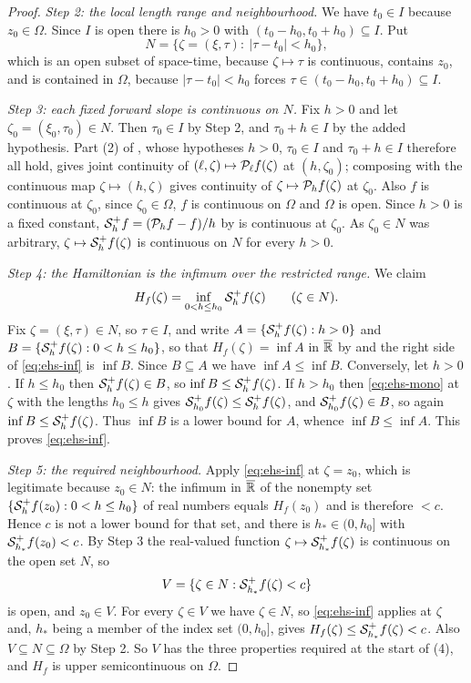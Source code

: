 \begin{proof}
\emph{Step 2: the local length range and neighbourhood.} We have $t_0\in I$
because $z_0\in\Omega$. Since $I$ is open there is $h_0>0$ with
$(t_0-h_0,t_0+h_0)\subseteq I$. Put
\[
  N=\{\zeta=(\xi,\tau):\ |\tau-t_0|<h_0\},
\]
which is an open subset of space-time, because $\zeta\mapsto\tau$ is continuous,
contains $z_0$, and is contained in $\Omega$, because $|\tau-t_0|<h_0$ forces
$\tau\in(t_0-h_0,t_0+h_0)\subseteq I$.

\emph{Step 3: each fixed forward slope is continuous on $N$.} Fix $h>0$ and let
$\zeta_0=(\xi_0,\tau_0)\in N$. Then $\tau_0\in I$ by Step 2, and
$\tau_0+h\in I$ by the added hypothesis. Part (2) of ,
whose hypotheses $h>0$, $\tau_0\in I$ and $\tau_0+h\in I$ therefore all hold,
gives joint continuity of $(\ell,\zeta)\mapsto\mathcal{P}_\ell f(\zeta)$ at
$(h,\zeta_0)$; composing with the continuous map
$\zeta\mapsto(h,\zeta)$ gives continuity of $\zeta\mapsto\mathcal{P}_hf(\zeta)$ at
$\zeta_0$. Also $f$ is continuous at $\zeta_0$, since $\zeta_0\in\Omega$, $f$ is
continuous on $\Omega$ and $\Omega$ is open. Since $h>0$ is a fixed constant,
$\mathcal{S}_h^+f=(\mathcal{P}_hf-f)/h$ by  is continuous at $\zeta_0$.
As $\zeta_0\in N$ was arbitrary, $\zeta\mapsto\mathcal{S}_h^+f(\zeta)$ is continuous
on $N$ for every $h>0$.

\emph{Step 4: the Hamiltonian is the infimum over the restricted range.} We
claim
\begin{equation}\label{eq:ehs-inf}
  H_f(\zeta)=\inf_{0<h\le h_0}\mathcal{S}_h^+f(\zeta)\qquad(\zeta\in N).
\end{equation}
Fix $\zeta=(\xi,\tau)\in N$, so $\tau\in I$, and write
$A=\{\mathcal{S}_h^+f(\zeta):h>0\}$ and $B=\{\mathcal{S}_h^+f(\zeta):0<h\le h_0\}$, so that
$H_f(\zeta)=\inf A$ in $\overline{\mathbb{R}}$ by  and the right
side of \eqref{eq:ehs-inf} is $\inf B$. Since $B\subseteq A$ we have
$\inf A\le\inf B$. Conversely, let $h>0$. If $h\le h_0$ then
$\mathcal{S}_h^+f(\zeta)\in B$, so $\inf B\le\mathcal{S}_h^+f(\zeta)$. If $h>h_0$ then
\eqref{eq:ehs-mono} at $\zeta$ with the lengths $h_0\le h$ gives
$\mathcal{S}_{h_0}^+f(\zeta)\le\mathcal{S}_h^+f(\zeta)$, and
$\mathcal{S}_{h_0}^+f(\zeta)\in B$, so again $\inf B\le\mathcal{S}_h^+f(\zeta)$. Thus
$\inf B$ is a lower bound for $A$, whence $\inf B\le\inf A$. This proves
\eqref{eq:ehs-inf}.

\emph{Step 5: the required neighbourhood.} Apply \eqref{eq:ehs-inf} at
$\zeta=z_0$, which is legitimate because $z_0\in N$: the infimum in
$\overline{\mathbb{R}}$ of the nonempty set $\{\mathcal{S}_h^+f(z_0):0<h\le h_0\}$ of real
numbers equals $H_f(z_0)$ and is therefore $<c$. Hence $c$ is not a lower bound
for that set, and there is $h_*\in(0,h_0]$ with $\mathcal{S}_{h_*}^+f(z_0)<c$. By
Step 3 the real-valued function $\zeta\mapsto\mathcal{S}_{h_*}^+f(\zeta)$ is
continuous on the open set $N$, so
\[
  V=\{\zeta\in N:\mathcal{S}_{h_*}^+f(\zeta)<c\}
\]
is open, and $z_0\in V$. For every $\zeta\in V$ we have $\zeta\in N$, so
\eqref{eq:ehs-inf} applies at $\zeta$ and, $h_*$ being a member of the index set
$(0,h_0]$, gives $H_f(\zeta)\le\mathcal{S}_{h_*}^+f(\zeta)<c$. Also
$V\subseteq N\subseteq\Omega$ by Step 2. So $V$ has the three properties
required at the start of (4), and $H_f$ is upper semicontinuous on $\Omega$.
\end{proof}
